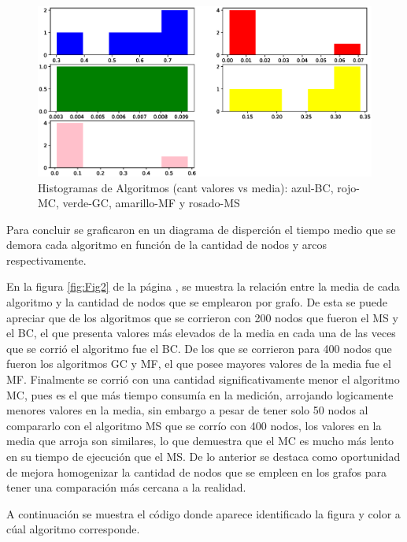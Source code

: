 \documentclass{article}
\begin{document}


\begin{figure}[h]
    \centering
    \includegraphics[scale=0.6]{Imagenes/Fig01.eps}
    \caption{Histogramas de Algoritmos (cant valores vs media): azul-BC, rojo-MC, verde-GC, amarillo-MF y rosado-MS}
    \label{fig:Fig01}
\end{figure}

Para concluir se graficaron en un diagrama de disperción el tiempo medio que se demora cada algoritmo en función de la cantidad de nodos y arcos respectivamente.

En la figura \ref{fig:Fig2} de la página \pageref{fig:Fig2}, se muestra la relación entre la media de cada algoritmo y la cantidad de nodos que se emplearon por grafo. De esta se puede apreciar que de los algoritmos que se corrieron con 200 nodos que fueron el MS y el BC, el que presenta valores más elevados de la media en cada una de las veces que se corrió el algoritmo fue el BC. De los que se corrieron para 400 nodos que fueron los algoritmos GC y MF, el que posee mayores valores de la media fue el MF. Finalmente se corrió con una cantidad significativamente menor el algoritmo MC, pues es el que más tiempo consumía en la medición, arrojando logicamente menores valores en la media, sin embargo a pesar de tener solo 50 nodos al compararlo con el algoritmo MS que se corrío con 400 nodos, los valores en la media que arroja son similares, lo que demuestra que el MC es mucho más lento en su tiempo de ejecución que el MS. De lo anterior se destaca como oportunidad de mejora homogenizar la cantidad de nodos que se empleen en los grafos para tener una comparación más cercana a la realidad.

A continuación se muestra el código donde aparece identificado la figura y color a cúal algoritmo corresponde.
\end{document}
